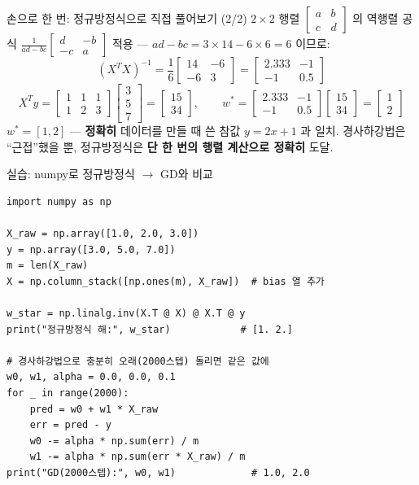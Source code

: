 \documentclass[aspectratio=169,11pt]{beamer}
\begin{document}
\begin{frame}{손으로 한 번: 정규방정식으로 직접 풀어보기 (2/2)}
  $2 \times 2$ 행렬 $\begin{bmatrix}a&b\\c&d\end{bmatrix}$ 의
  역행렬 공식 $\frac{1}{ad-bc}\begin{bmatrix}d&-b\\-c&a\end{bmatrix}$
  적용 --- $ad-bc = 3\times14-6\times6 = 6$ 이므로:
  \[
  (X^TX)^{-1} = \frac{1}{6}\begin{bmatrix}14&-6\\-6&3\end{bmatrix}
  = \begin{bmatrix}2.333&-1\\-1&0.5\end{bmatrix}
  \]
  \[
  X^Ty = \begin{bmatrix}1&1&1\\1&2&3\end{bmatrix}
  \begin{bmatrix}3\\5\\7\end{bmatrix}
  = \begin{bmatrix}15\\34\end{bmatrix}, \hspace{2em}
  w^{*} = \begin{bmatrix}2.333&-1\\-1&0.5\end{bmatrix}
  \begin{bmatrix}15\\34\end{bmatrix}
  = \begin{bmatrix}1\\2\end{bmatrix}
  \]
  $w^{*} = [1, 2]$ --- \textbf{정확히} 데이터를 만들 때 쓴 참값
  $y = 2x+1$ 과 일치. 경사하강법은 ``근접''했을 뿐, 정규방정식은
  \textbf{단 한 번의 행렬 계산으로 정확히} 도달.
\end{frame}

\begin{frame}[fragile]{실습: numpy로 정규방정식 $\to$ GD와 비교}
\begin{lstlisting}
import numpy as np

X_raw = np.array([1.0, 2.0, 3.0])
y = np.array([3.0, 5.0, 7.0])
m = len(X_raw)
X = np.column_stack([np.ones(m), X_raw])  # bias 열 추가

w_star = np.linalg.inv(X.T @ X) @ X.T @ y
print("정규방정식 해:", w_star)            # [1. 2.]

# 경사하강법으로 충분히 오래(2000스텝) 돌리면 같은 값에
w0, w1, alpha = 0.0, 0.0, 0.1
for _ in range(2000):
    pred = w0 + w1 * X_raw
    err = pred - y
    w0 -= alpha * np.sum(err) / m
    w1 -= alpha * np.sum(err * X_raw) / m
print("GD(2000스텝):", w0, w1)             # 1.0, 2.0
\end{lstlisting}
\end{frame}
\end{document}
